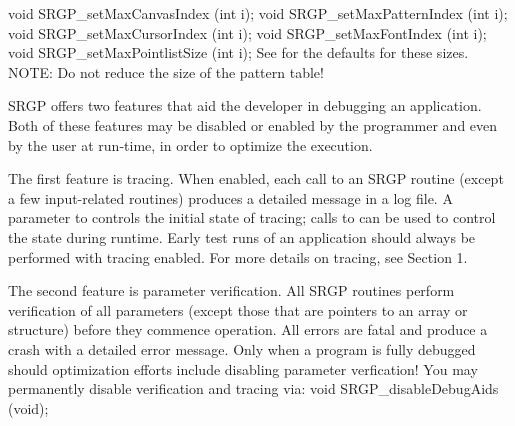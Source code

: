 \newsynopsis
void SRGP_setMaxCanvasIndex (int i);
void SRGP_setMaxPatternIndex (int i);
void SRGP_setMaxCursorIndex (int i);
void SRGP_setMaxFontIndex (int i);
void SRGP_setMaxPointlistSize (int i);
\endsynopsis
See  for
the defaults for these sizes.  NOTE:  Do not reduce
the size of the pattern table!




SRGP offers two features that aid the developer in debugging an application.
Both of these features may be disabled or enabled by the programmer and even by
the user at run-time, in order to optimize the execution.

\newpar
The first feature is tracing.  When enabled, each call to an SRGP
routine (except a few input-related routines) produces a detailed
message in a log file.  A parameter to  controls the
initial state of tracing; calls to  can be used to control
the state during runtime.  Early test runs of an application should always be
performed with tracing enabled.  For more details on tracing, see Section 1.

\newpar
The second feature is parameter verification.  All SRGP routines perform
verification of all parameters (except those that are pointers to an
array or structure) before they commence operation.  All errors are fatal and
produce a crash with a detailed error message.  Only when a program is fully
debugged should optimization efforts include disabling parameter verfication!
You may permanently disable verification and tracing via:
\begincode
void SRGP_disableDebugAids (void);
\endcode





